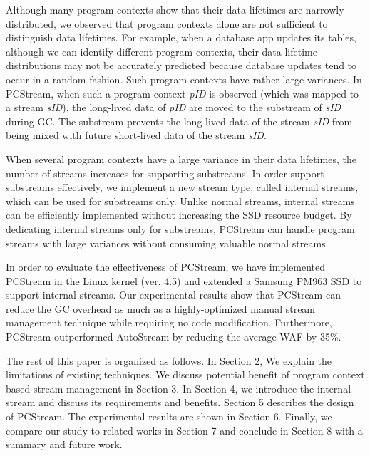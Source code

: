 Although many program contexts show that their data lifetimes are 
narrowly distributed, we observed 
that program contexts alone are not sufficient to distinguish data lifetimes.  
For example, when a database app updates its tables, although we can identify 
different program contexts, their data
lifetime distributions may not be accurately predicted because database 
updates tend to occur in a random fashion.  
Such program contexts have rather large variances.
In \textsf{\small PCStream}, 
when such a program context {\it pID} is observed (which was mapped to a stream {\it sID}), 
the long-lived data of {\it pID} are moved to the substream of {\it sID}
during GC.  
The substream prevents the long-lived data of the stream {\it sID} 
from being mixed with future short-lived data of the stream {\it sID}.

When several program contexts have a large variance in their data lifetimes, 
the number of streams increases for supporting substreams.
In order support substreams effectively, we implement a new stream type, 
called internal streams, which can be used for substreams only. 
Unlike normal streams, internal streams can be efficiently
implemented without increasing the SSD resource budget.  
By dedicating internal streams only for substreams, PCStream can handle 
program streams with large variances without consuming valuable normal
streams.

In order to evaluate the effectiveness of \textsf{\small PCStream}, 
we have implemented \textsf{\small PCStream}
in the Linux kernel (ver. 4.5) and 
extended a Samsung PM963 SSD to support internal streams.
Our experimental results show that \textsf{\small PCStream}
can reduce the GC overhead as much as a highly-optimized 
manual stream management technique while requiring no code modification.  
Furthermore, \textsf{\small PCStream} outperformed \textsf{\small AutoStream} 
by reducing the average WAF by 35\%.

The rest of this paper is organized as follows. 
In Section 2, We explain the limitations of existing techniques.
We discuss potential benefit of program context based 
stream management in Section 3.
In Section 4, we introduce the internal stream and discuss its
requirements and benefits.
Section 5 describes 
the design of \textsf{\small PCStream}.
The experimental results are shown in Section 6. 
Finally, we compare our study to related works in Section 7
and conclude in Section 8 with a summary and future work. 

